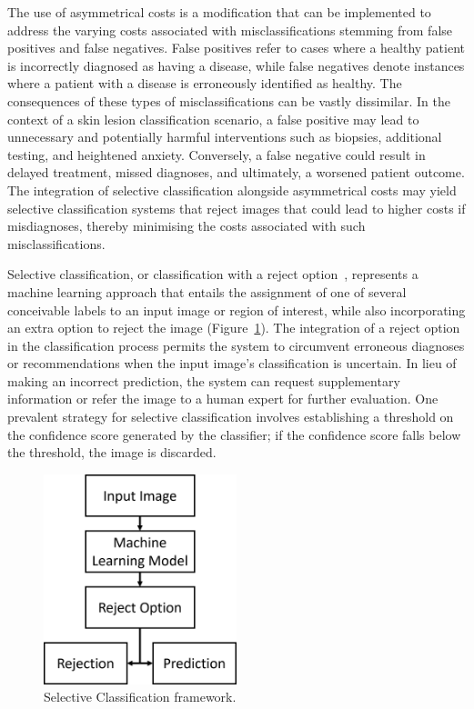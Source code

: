 The use of asymmetrical costs is a modification that can be implemented to address the varying costs associated with misclassifications stemming from false positives and false negatives. False positives refer to cases where a healthy patient is incorrectly diagnosed as having a disease, while false negatives denote instances where a patient with a disease is erroneously identified as healthy. The consequences of these types of misclassifications can be vastly dissimilar. In the context of a skin lesion classification scenario, a false positive may lead to unnecessary and potentially harmful interventions such as biopsies, additional testing, and heightened anxiety. Conversely, a false negative could result in delayed treatment, missed diagnoses, and ultimately, a worsened patient outcome. The integration of selective classification alongside asymmetrical costs may yield selective classification systems that reject images that could lead to higher costs if misdiagnoses, thereby minimising the costs associated with such misclassifications.

Selective classification, or classification with a reject option~\citep{chow1957optimum}, represents a machine learning approach that entails the assignment of one of several conceivable labels to an input image or region of interest, while also incorporating an extra option to reject the image (Figure~\ref{fig:selective_classification}). The integration of a reject option in the classification process permits the system to circumvent erroneous diagnoses or recommendations when the input image's classification is uncertain. In lieu of making an incorrect prediction, the system can request supplementary information or refer the image to a human expert for further evaluation. One prevalent strategy for selective classification involves establishing a threshold on the confidence score generated by the classifier; if the confidence score falls below the threshold, the image is discarded.

\begin{figure}[h]
	\centering
	\includegraphics[width=0.5\textwidth]{images/selective_classification.png}
	\caption{Selective Classification framework.}
	\label{fig:selective_classification}
\end{figure}


